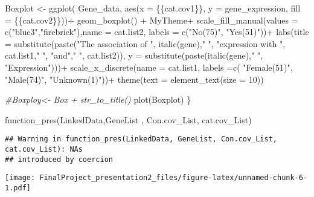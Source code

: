 \documentclass[
]{article}
\newenvironment{Shaded}{\begin{snugshade}}{\end{snugshade}}
\newcommand{\AttributeTok}[1]{\textcolor[rgb]{0.77,0.63,0.00}{#1}}
\newcommand{\CommentTok}[1]{\textcolor[rgb]{0.56,0.35,0.01}{\textit{#1}}}
\newcommand{\DecValTok}[1]{\textcolor[rgb]{0.00,0.00,0.81}{#1}}
\newcommand{\FunctionTok}[1]{\textcolor[rgb]{0.00,0.00,0.00}{#1}}
\newcommand{\NormalTok}[1]{#1}
\newcommand{\OtherTok}[1]{\textcolor[rgb]{0.56,0.35,0.01}{#1}}
\newcommand{\SpecialCharTok}[1]{\textcolor[rgb]{0.00,0.00,0.00}{#1}}
\newcommand{\StringTok}[1]{\textcolor[rgb]{0.31,0.60,0.02}{#1}}
\begin{document}
\begin{Shaded}
\begin{Highlighting}[]
\NormalTok{Boxplot }\OtherTok{\textless{}{-}} \FunctionTok{ggplot}\NormalTok{( Gene\_data, }\FunctionTok{aes}\NormalTok{(}\AttributeTok{x =}\NormalTok{ \{\{cat.cov1\}\}, }\AttributeTok{y =}\NormalTok{ gene\_expression, }\AttributeTok{fill =}\NormalTok{ \{\{cat.cov2\}\}))}\SpecialCharTok{+}
  \FunctionTok{geom\_boxplot}\NormalTok{() }\SpecialCharTok{+}
\NormalTok{  MyTheme}\SpecialCharTok{+}
  \FunctionTok{scale\_fill\_manual}\NormalTok{(}\AttributeTok{values =} \FunctionTok{c}\NormalTok{(}\StringTok{"blue3"}\NormalTok{,}\StringTok{"firebrick"}\NormalTok{),}\AttributeTok{name =}\NormalTok{ cat.list2, }\AttributeTok{labels =} \FunctionTok{c}\NormalTok{(}\StringTok{"No(75)"}\NormalTok{, }\StringTok{"Yes(51)"}\NormalTok{))}\SpecialCharTok{+}
  \FunctionTok{labs}\NormalTok{(}\AttributeTok{title =} \FunctionTok{substitute}\NormalTok{(}\FunctionTok{paste}\NormalTok{(}\StringTok{"The association of "}\NormalTok{, }\FunctionTok{italic}\NormalTok{(gene),}\StringTok{" "}\NormalTok{, }\StringTok{"expression with "}\NormalTok{, cat.list1,}\StringTok{" "}\NormalTok{, }\StringTok{"and"}\NormalTok{,}\StringTok{" "}\NormalTok{, cat.list2)), }\AttributeTok{y =} \FunctionTok{substitute}\NormalTok{(}\FunctionTok{paste}\NormalTok{(}\FunctionTok{italic}\NormalTok{(gene),}\StringTok{" "}\NormalTok{, }\StringTok{"Expression"}\NormalTok{)))}\SpecialCharTok{+}
  \FunctionTok{scale\_x\_discrete}\NormalTok{(}\AttributeTok{name =}\NormalTok{ cat.list1, }\AttributeTok{labels =}\FunctionTok{c}\NormalTok{( }\StringTok{"Female(51)"}\NormalTok{, }\StringTok{"Male(74)"}\NormalTok{, }\StringTok{"Unknown(1)"}\NormalTok{))}\SpecialCharTok{+}
  \FunctionTok{theme}\NormalTok{(}\AttributeTok{text =} \FunctionTok{element\_text}\NormalTok{(}\AttributeTok{size =} \DecValTok{10}\NormalTok{))}

\CommentTok{\#Boxploy\textless{}{-} Box + str\_to\_title()}
\FunctionTok{plot}\NormalTok{(Boxplot)}
\NormalTok{\}}


\FunctionTok{function\_pres}\NormalTok{(LinkedData,GeneList , Con.cov\_List, cat.cov\_List)}
\end{Highlighting}
\end{Shaded}

\begin{verbatim}
## Warning in function_pres(LinkedData, GeneList, Con.cov_List, cat.cov_List): NAs
## introduced by coercion
\end{verbatim}

\texttt{[image: FinalProject\_presentation2\_files/figure-latex/unnamed-chunk-6-1.pdf]}
\end{document}
